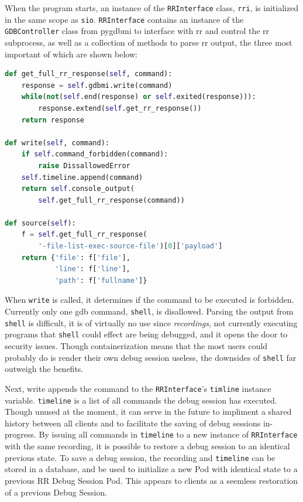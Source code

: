 \documentclass[12pt]{article}
\begin{document}
When the program starts, an instance of the \lstinline{RRInterface}
class, \lstinline{rri}, is initialized in the same scope as
\lstinline{sio}.  \lstinline{RRInterface} contains an instance of the
\lstinline{GDBController} class from pygdbmi to interface with rr and
control the rr subprocess, as well as a collection of methods to parse
rr output, the three most important of which are shown below: \\

\begin{lstlisting}[language=Python,basicstyle=\linespread{0.5}\ttfamily,caption={RRInterface},captionpos=b]
def get_full_rr_response(self, command):
    response = self.gdbmi.write(command)
    while(not(self.end(response) or self.exited(response))):
        response.extend(self.get_rr_response())
    return response

def write(self, command):
    if self.command_forbidden(command):
        raise DissallowedError
    self.timeline.append(command)
    return self.console_output(
        self.get_full_rr_response(command))

def source(self):
    f = self.get_full_rr_response(
        '-file-list-exec-source-file')[0]['payload']
    return {'file': f['file'],
            'line': f['line'],
            'path': f['fullname']}
\end{lstlisting}

When \lstinline{write} is called, it determines if the command to be
executed is forbidden.  Currently only one gdb command,
\lstinline{shell}, is disallowed.  Parsing the output from
\lstinline{shell} is difficult, it is of virtually no use since
\textit{recordings}, not currently executing programs that
\lstinline{shell} could effect are being debugged, and it opens the
door to security issues.  Though containerization means that the most
users could probably do is render their own debug session useless, the
downsides of \lstinline{shell} far outweigh the benefits.
\par

Next, write appends the command to the \lstinline{RRInterface}'s
\lstinline{timline} instance variable.  \lstinline{timeline} is a list
of all commands the debug session has executed.  Though unused at the
moment, it can serve in the future to impliment a shared history
between all clients and to facilitate the saving of debug sessions
in-progress.  By issuing all commands in \lstinline{timeline} to a new
instance of \lstinline{RRInterface} with the same recording, it is
possible to restore a debug session to an identical previous state.
To save a debug session, the recording and \lstinline{timeline} can be
stored in a database, and be used to initialize a new Pod with
identical state to a previous RR Debug Session Pod.  This appears to
clients as a seemless restoration of a previous Debug Session.
\par
\end{document}
